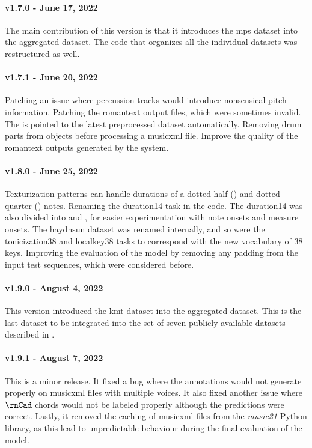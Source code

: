 \paragraph{v1.7.0 - June 17, 2022}
The main contribution of this version is that it introduces
the \gls{mps} dataset into the aggregated dataset. The code
that organizes all the individual datasets was restructured
as well.

\paragraph{v1.7.1 - June 20, 2022}
Patching an issue where percussion tracks would introduce
nonsensical pitch information. Patching the \gls{romantext}
output files, which were sometimes invalid. The
 is pointed to the latest preprocessed dataset
automatically. Removing drum parts from
 objects before processing a
\gls{musicxml} file. Improve the quality of the
\gls{romantext} outputs generated by the system.

\paragraph{v1.8.0 - June 25, 2022}
Texturization patterns can handle durations of a dotted half
(\musHalfDotted) and dotted quarter (\musQuarterDotted)
notes. Renaming the \gls{duration14} task in the code. The
\gls{duration14} was also divided into 
and , for easier experimentation with note
onsets and measure onsets. The \gls{haydnsun} dataset was
renamed internally, and so were the \gls{tonicization38} and
\gls{localkey38} tasks to correspond with the new vocabulary
of 38 keys. Improving the evaluation of the model by
removing any padding from the input test sequences, which
were considered before.

\paragraph{v1.9.0 - August 4, 2022}
This version introduced the \gls{kmt} dataset into the
aggregated dataset. This is the last dataset to be
integrated into the set of seven publicly available datasets
described in .

\paragraph{v1.9.1 - August 7, 2022}
This is a minor release. It fixed a bug where the
annotations would not generate properly on \gls{musicxml}
files with multiple voices. It also fixed another issue
where $\rnCad$ chords would not be labeled properly although
the predictions were correct. Lastly, it removed the caching
of \gls{musicxml} files from the \emph{music21} Python
library, as this lead to unpredictable behaviour during the
final evaluation of the model.
